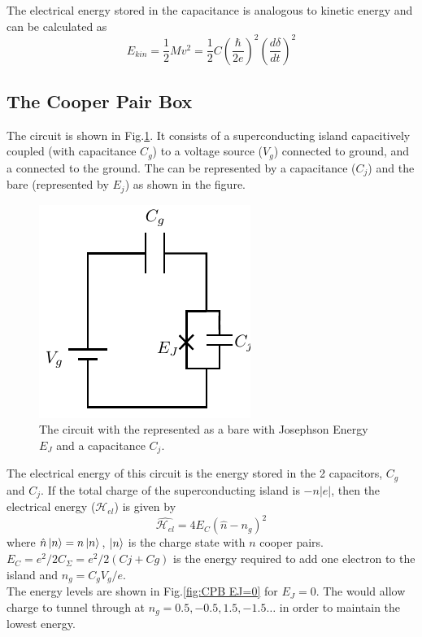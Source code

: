 The electrical energy stored in the capacitance is analogous to kinetic energy and can be calculated as
\begin{equation}
E_{kin}=\frac{1}{2}Mv^2=\frac{1}{2}C\left(\frac{\hbar}{2e}\right)^2\left(\frac{d\delta}{dt}\right)^2
\end{equation}

\subsection{The Cooper Pair Box}

The \CPB circuit is shown in Fig.\ref{fig:cooperpairbox}. It consists of a superconducting island capacitively coupled (with capacitance $C_g$) to a voltage source ($V_g$) connected to ground, and a \JJ connected to the ground. The \JJ can be represented by a capacitance ($C_j$) and the bare \JJ (represented by $E_j$) as shown in the figure.

\begin{figure}
\centering
\includegraphics{Figures/CPB}
\decoRule
\caption[\CPB circuit]{The \CPB circuit with the \JJ represented as a bare \JJ with Josephson Energy $E_J$ and a capacitance $C_j$.}
\label{fig:cooperpairbox}
\end{figure}

The electrical energy of this circuit is the energy stored in the 2 capacitors, $C_g$ and $C_j$. If the total charge of the superconducting island is $-n|e|$, then the electrical energy ($\mathcal{H}_{el}$) is given by \cite{Schuster2007}
\begin{equation}
\hat{\mathcal{H}_{el}}=4E_C(\hat{n}-n_g)^2
\end{equation}
where $\hat{n}\ket{n}=n\ket{n}$, $\ket{n}$ is the charge state with $n$ cooper pairs.\\
$E_C=e^2/2C_\Sigma=e^2/2(Cj+Cg)$ is the energy required to add one electron to the island and $n_g=C_gV_g/e$.\\
The energy levels are shown in Fig.\ref{fig:CPB EJ=0} for $E_J=0$. The \JJ would allow charge to tunnel through at $n_g=0.5,-0.5,1.5,-1.5\ldots$ in order to maintain the lowest energy.

